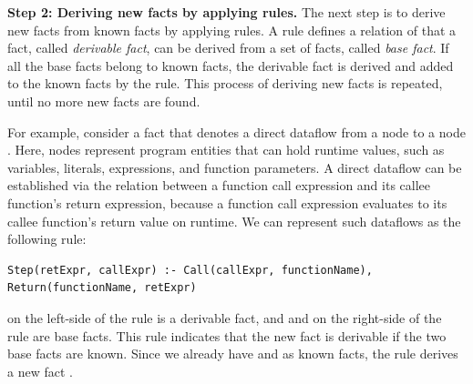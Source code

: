 
\smallskip
\textbf{Step 2: Deriving new facts by applying rules.}
The next step is to derive new facts from known facts by applying rules.
A rule defines a relation of that a fact, called {\it derivable fact}, can be
derived from a set of facts, called {\it base fact}. 
If all the base facts belong to known facts, the derivable fact is derived and
added to the known facts by the rule.
This process of deriving new facts is repeated, until no more new facts are
found.


For example, consider a fact  that denotes a direct dataflow
from a node  to a node . 
Here, nodes represent program entities that can hold runtime values,
such as variables, literals, expressions, and function parameters. 
A direct dataflow can be established via the relation between a function call
expression and its callee function's return expression, because a function
call expression evaluates to its callee function's return value on runtime.
We can represent such dataflows as the following rule:
\begin{lstlisting}[style=mrule]
Step(retExpr, callExpr) :- Call(callExpr, functionName), Return(functionName, retExpr)
\end{lstlisting}

\noindent
{} on the left-side of the rule is a derivable
fact, and  and  on the right-side of the rule are base facts.  
This rule indicates that the new fact  is
derivable if the two base facts are known.
Since we already have  and 
as known facts, the rule derives a new fact .

